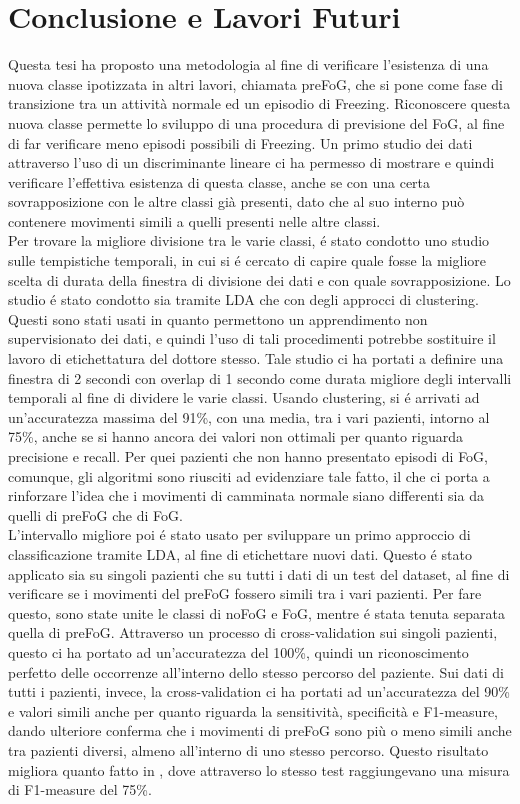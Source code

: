 
\chapter{Conclusione e Lavori Futuri}\label{chap9:Concl}
Questa tesi ha proposto una metodologia al fine di verificare l'esistenza di una nuova classe ipotizzata in altri lavori, chiamata preFoG, che si pone come fase di transizione tra un attività normale ed un episodio di Freezing. Riconoscere questa nuova classe permette lo sviluppo di una procedura di previsione del FoG, al fine di far verificare meno episodi possibili di Freezing. Un primo studio dei dati attraverso l'uso di un discriminante lineare ci ha permesso di mostrare e quindi verificare l'effettiva esistenza di questa classe, anche se con una certa sovrapposizione con le altre classi già presenti, dato che al suo interno può contenere movimenti simili a quelli presenti nelle altre classi.\\ 
Per trovare la migliore divisione tra le varie classi, é stato condotto uno studio sulle tempistiche temporali, in cui si é cercato di capire quale fosse la migliore scelta di durata della finestra di divisione dei dati e con quale sovrapposizione. Lo studio é stato condotto sia tramite LDA che con degli approcci di clustering. Questi sono stati usati in quanto permettono un apprendimento non supervisionato dei dati, e quindi l'uso di tali procedimenti potrebbe sostituire il lavoro di etichettatura del dottore stesso. Tale studio ci ha portati a definire una finestra di 2 secondi con overlap di 1 secondo come durata migliore degli intervalli temporali al fine di dividere le varie classi. Usando clustering, si é arrivati ad un'accuratezza massima del 91\%, con una media, tra i vari pazienti, intorno al 75\%, anche se si hanno ancora dei valori non ottimali per quanto riguarda precisione e recall. Per quei pazienti che non hanno presentato episodi di FoG, comunque, gli algoritmi sono riusciti ad evidenziare tale fatto, il che ci porta a rinforzare l'idea che i movimenti di camminata normale siano differenti sia da quelli di preFoG che di FoG.\\
L'intervallo migliore poi é stato usato per sviluppare un primo approccio di classificazione tramite LDA, al fine di etichettare nuovi dati. Questo é stato applicato sia su singoli pazienti che su tutti i dati di un test del dataset, al fine di verificare se i movimenti del preFoG fossero simili tra i vari pazienti. Per fare questo, sono state unite le classi di noFoG e FoG, mentre é stata tenuta separata quella di preFoG. Attraverso un processo di cross-validation sui singoli pazienti, questo ci ha portato ad un'accuratezza del 100\%, quindi un riconoscimento perfetto delle occorrenze all'interno dello stesso percorso del paziente. Sui dati di tutti i pazienti, invece, la cross-validation ci ha portati ad un'accuratezza del 90\% e valori simili anche per quanto riguarda la sensitività, specificità e F1-measure, dando ulteriore conferma che i movimenti di preFoG sono più o meno simili anche tra pazienti diversi, almeno all'interno di uno stesso percorso. Questo risultato migliora quanto fatto in \cite{12}, dove attraverso lo stesso test raggiungevano una misura di F1-measure del 75\%.\\
